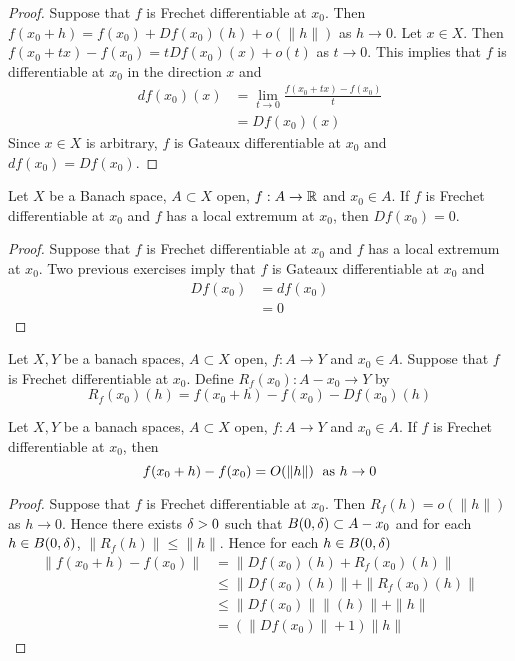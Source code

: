 \documentclass{book}
\begin{document}
	\begin{proof}
	Suppose that $f$ is Frechet differentiable at $x_0$. Then $f(x_0 + h) = f(x_0) + Df(x_0)(h) + o(\|h\| )$ as $h \rightarrow 0$. Let $x \in X$. Then $f(x_0 + tx) - f(x_0) = tDf(x_0)(x) + o(t)$ as $t \rightarrow 0$. This implies that $f$ is differentiable at $x_0$ in the direction $x$ and 
	\begin{align*}
	df(x_0)(x) 
	&= \lim_{t \rightarrow 0} \frac{f(x_0 + tx) - f(x_0)}{t} \\
	&= Df(x_0)(x)
	\end{align*}
	Since $x \in X$ is arbitrary, $f$ is Gateaux differentiable at $x_0$ and $df(x_0) = Df(x_0)$.
	\end{proof}
	
	\begin{ex} 
	Let $X$ be a Banach space, $A \subset X$ open, $f:A \rightarrow \mathbb{R}$ and $x_0 \in A$. If $f$ is Frechet differentiable at $x_0$ and $f$ has a local extremum at $x_0$, then $Df(x_0) = 0$.
	\end{ex}	
	
	\begin{proof}
	Suppose that $f$ is Frechet differentiable at $x_0$ and $f$ has a local extremum at $x_0$. Two previous exercises imply that $f$ is Gateaux differentiable at $x_0$ and 
	\begin{align*}
	Df(x_0) 
	&= df(x_0) \\
	&= 0
	\end{align*}	
	\end{proof}
	
	\begin{defn} 
	Let $X, Y$ be a banach spaces, $A \subset X$ open, $f:A \rightarrow Y$ and $x_0 \in A$. Suppose that $f$ is Frechet differentiable at $x_0$. Define $R_f(x_0): A - x_0 \rightarrow Y$ by $$R_f(x_0)(h) = f(x_0 + h) - f(x_0) - Df(x_0)(h)$$
	\end{defn}
	
	\begin{ex} 
	Let $X, Y$ be a banach spaces, $A \subset X$ open, $f:A \rightarrow Y$ and $x_0 \in A$. If $f$ is Frechet differentiable at $x_0$, then $$f(x_0+h) - f(x_0) = O(\|h\|) \hspace{.1cm} \text{ as } h \rightarrow 0$$ 
	\end{ex}
	
	\begin{proof}
	Suppose that $f$ is Frechet differentiable at $x_0$. Then $R_f(h) = o(\|h\|)$ as $h \rightarrow 0$. Hence there exists $\delta >0$ such that $B(0, \delta) \subset A - x_0$ and for each $h \in B(0, \delta)$, $\|R_f(h)\| \leq \|h\|$. Hence for each $h \in B(0, \delta)$
	\begin{align*}
	\|f(x_0+h) - f(x_0) \| 
	&= \|Df(x_0)(h) + R_f(x_0)(h)\| \\
	& \leq \|Df(x_0)(h)\| + \|R_f(x_0)(h)\|  \\
	& \leq \|Df(x_0)\| \|(h)\| + \|h\| \\
	& = (\|Df(x_0)\| + 1) \|h\|
	\end{align*}
	\end{proof}
	
\end{document}
